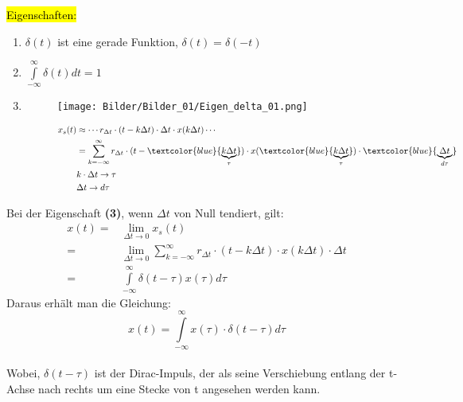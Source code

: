 \vspace{0.5cm}
\hl{Eigenschaften:}
\begin{enumerate}
    \item 
    $\delta (t)$ ist eine gerade Funktion, $\delta (t)=\delta (-t)$
    \item
    $\int\limits_{-\infty}^{\infty} \delta(t)dt=1$
    \item
    \hspace{1.77cm} 
    \begin{figure}[H]
        \centering
        \begin{minipage}{.45\textwidth}
            \centering
            \texttt{[image: Bilder/Bilder\_01/Eigen\_delta\_01.png]}
        \end{minipage}
        \begin{minipage}{.45\textwidth}
            \begin{equation}
                \begin{split}
                    x_s(t)&\approx \cdots r_{\Delta t} \cdot (t-k\Delta t) \cdot \Delta t \cdot x(k\Delta t)\cdots\\
                    &=\sum_{k=-\infty}^{\infty} r_{\Delta t} \cdot (t-\textcolor{blue}{\underbrace{k\Delta t}_\tau}) \cdot x(\textcolor{blue}{\underbrace{k\Delta t}_\tau}) \cdot \textcolor{blue}{\underbrace{\Delta t}_{d\tau}} \\
                    & k \cdot \Delta t \rightarrow \tau \\
                    & \Delta t \rightarrow d\tau 
                \end{split}
                \nonumber
            \end{equation}
        \end{minipage}
    \end{figure}
\end{enumerate}

Bei der Eigenschaft \textbf{(3)}, wenn $\Delta t$ von Null tendiert, gilt:
\begin{equation}
    \begin{split}
      x(t)=&\lim_{\Delta t \to 0}x_s(t)\\
          =&\lim_{\Delta t \to 0}\sum_{k=-\infty}^{\infty} r_{\Delta t} \cdot (t-k\Delta t) \cdot x(k\Delta t) \cdot \Delta t \\
          =&\int\limits_{-\infty}^{\infty}\delta (t-\tau)x(\tau)d\tau  
    \end{split}
    \nonumber
\end{equation}
Daraus erhält man die Gleichung:\\
\begin{equation}
    \boxed{x(t)=\int\limits_{-\infty}^{\infty}x(\tau) \cdot \delta (t-\tau)d\tau}
\end{equation}
\\Wobei, $\delta (t-\tau)$ ist der Dirac-Impuls, der als seine Verschiebung entlang der t-Achse nach rechts um eine Stecke von t angesehen werden kann.\\

